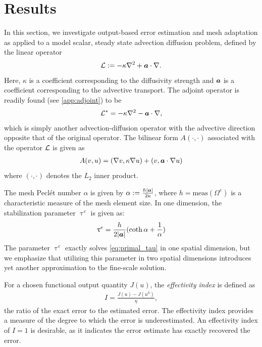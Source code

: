\section{Results}
\label{sec:Results}

In this section, we investigate output-based error estimation and
mesh adaptation as applied to a model scalar, steady state advection
diffusion problem, defined by the linear operator
%
\begin{gather}
\mathcal{L} := -\kappa \nabla^2 + \boldsymbol{a} \cdot \nabla.
\label{eq:adv_diff}
\end{gather}
%
Here, $\kappa$ is a coefficient corresponding to the diffusivity
strength and $\boldsymbol{a}$ is a coefficient corresponding
to the advective transport. The adjoint operator is readily found
(see \ref{app:adjoint}) to be
%
\begin{gather}
\mathcal{L}^* = -\kappa \nabla^2 - \boldsymbol{a} \cdot \nabla,
\label{eq:adv_diff_adjoint}
\end{gather}
%
which is simply another advection-diffusion operator with the advective
direction opposite that of the original operator. The bilinear
form $A(\cdot, \cdot)$ associated with the operator $\mathcal{L}$ is given as
%
\begin{gather}
A(v,u) = (\nabla v, \kappa \nabla u) + (v, \boldsymbol{a} \cdot \nabla u)
\label{eq:adv_diff_bilinear}
\end{gather}
%
where $(\cdot, \cdot)$ denotes the $L_2$ inner product.

The mesh Pecl\'{e}t number $\alpha$ is given by
$\alpha := \frac{h | \boldsymbol{a} |}{2 \kappa}$, where
$h = \text{meas}(\Omega^e)$ is a characteristic measure of
the mesh element size. In one dimension, the stabilization
parameter $\uptau^e$ is given \cite{hughes1998variational} as:
%
\begin{gather}
\uptau^e = \frac{h}{2 | \boldsymbol{a} |}( \coth{\alpha} + \frac{1}{\alpha})
\label{eq:adv_diff_tau}
\end{gather}
%
The parameter $\uptau^e$ exactly solves \eqref{eq:primal_tau}
in one spatial dimension, but we emphasize that utilizing this
parameter in two spatial dimensions introduces yet another
approximation to the fine-scale solution.

For a chosen functional output quantity $J(u)$, the
\emph{effectivity index} is defined as
%
\begin{gather}
I = \frac{J(u) - J(u^h)}{\eta},
\label{eq:effectivity}
\end{gather}
%
the ratio of the exact error to the estimated error. The effectivity
index provides a measure of the degree to which the error is
underestimated. An effectivity index of $I = 1$ is desirable, as it
indicates the error estimate has exactly recovered the error.


